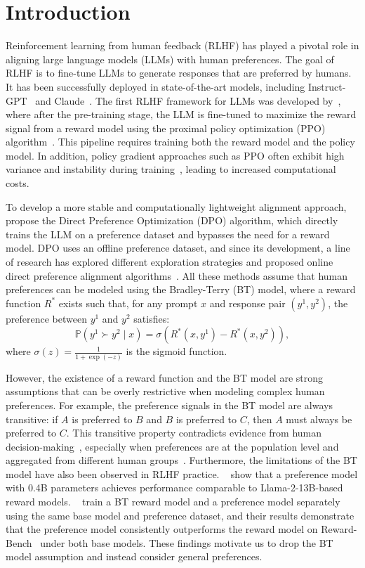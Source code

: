 \section{Introduction}\label{sec:intro}
Reinforcement learning from human feedback (RLHF) has played a pivotal role in aligning large language models (LLMs) with human preferences. The goal of RLHF is to fine-tune LLMs to generate responses that are preferred by humans. It has been successfully deployed in state-of-the-art models, including Instruct-GPT~\citep{ouyang2022training} and Claude~\citep{bai2022training}. The first RLHF framework for LLMs was developed by~\citet{ouyang2022training}, where after the pre-training stage, the LLM is fine-tuned to maximize the reward signal from a reward model using the proximal policy optimization (PPO) algorithm~\citep{schulman2017proximal}. This pipeline requires training both the reward model and the policy model. In addition, policy gradient approaches such as PPO often exhibit high variance and instability during training~\citep{peng2023stabilizing}, leading to increased computational costs.

To develop a more stable and computationally lightweight alignment approach,~\citet{rafailov2024direct} propose the Direct Preference Optimization (DPO) algorithm, which directly trains the LLM on a preference dataset and bypasses the need for a reward model. DPO uses an offline preference dataset, and since its development, a line of research has explored different exploration strategies and proposed online direct preference alignment algorithms~\citep{xiong2024iterative,xie2024exploratory,dong2024rlhf,yuan2024self}. All these methods assume that human preferences can be modeled using the Bradley-Terry (BT) model, where a reward function $R^*$ exists such that, for any prompt $x$ and response pair $(y^1, y^2)$, the preference between $y^1$ and $y^2$ satisfies:  
\[
\mathbb{P}(y^1 \succ y^2 \mid x) = \sigma(R^*(x,y^1) - R^*(x,y^2)),
\]
where $\sigma(z) = \frac{1}{1+\exp(-z)}$ is the sigmoid function.

However, the existence of a reward function and the BT model are strong assumptions that can be overly restrictive when modeling complex human preferences. For example, the preference signals in the BT model are always transitive: if $A$ is preferred to $B$ and $B$ is preferred to $C$, then $A$ must always be preferred to $C$. This transitive property contradicts evidence from human decision-making~\citep{may1954intransitivity,tversky1969intransitivity}, especially when preferences are at the population level and aggregated from different human groups~\citep{may1954intransitivity,ye2024theoretical}.  Furthermore, the limitations of the BT model have also been observed in RLHF practice. ~\citet{jiang2023llm} show that a preference model with 0.4B parameters achieves performance comparable to Llama-2-13B-based reward models. ~\citet{ye2024theoretical} train a BT reward model and a preference model separately using the same base model and preference dataset, and their results demonstrate that the preference model consistently outperforms the reward model on Reward-Bench~\citep{lambert2024rewardbench} under both base models. These findings motivate us to drop the BT model assumption and instead consider general preferences.

